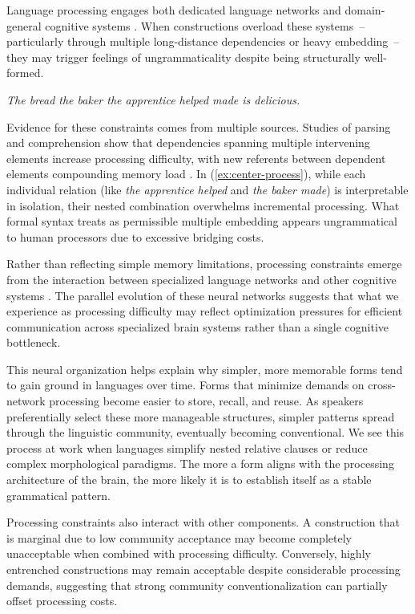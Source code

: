 \documentclass[12pt,letterpaper]{article}
\begin{document}
Language processing engages both dedicated language networks and domain-general cognitive systems \autocite{Fedorenko2024}. When constructions overload these systems~-- particularly through multiple long-distance dependencies or heavy embedding~-- they may trigger feelings of ungrammaticality despite being structurally well-formed.

\ea
\textit{The bread the baker the apprentice helped made is delicious.}\label{ex:center-process}
\z

Evidence for these constraints comes from multiple sources. Studies of parsing and comprehension show that dependencies spanning multiple intervening elements increase processing difficulty, with new referents between dependent elements compounding memory load \autocite{gibson2000,Gibson2024}. In (\ref{ex:center-process}), while each individual relation (like \textit{the apprentice helped} and \textit{the baker made}) is interpretable in isolation, their nested combination overwhelms incremental processing. What formal syntax treats as permissible multiple embedding appears ungrammatical to human processors due to excessive bridging costs.

Rather than reflecting simple memory limitations, processing constraints emerge from the interaction between specialized language networks and other cognitive systems \autocite{Fedorenko2024}. The parallel evolution of these neural networks suggests that what we experience as processing difficulty may reflect optimization pressures for efficient communication across specialized brain systems rather than a single cognitive bottleneck.

This neural organization helps explain why simpler, more memorable forms tend to gain ground in languages over time. Forms that minimize demands on cross-network processing become easier to store, recall, and reuse. As speakers preferentially select these more manageable structures, simpler patterns spread through the linguistic community, eventually becoming conventional. We see this process at work when languages simplify nested relative clauses or reduce complex morphological paradigms. The more a form aligns with the processing architecture of the brain, the more likely it is to establish itself as a stable grammatical pattern.

Processing constraints also interact with other components. A construction that is marginal due to low community acceptance may become completely unacceptable when combined with processing difficulty. Conversely, highly entrenched constructions may remain acceptable despite considerable processing demands, suggesting that strong community conventionalization can partially offset processing costs.
\end{document}

